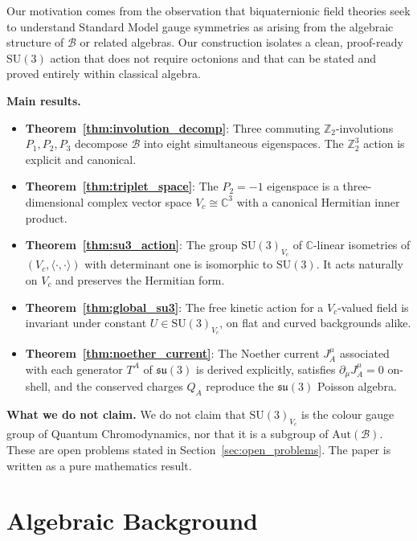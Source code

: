 \documentclass[12pt,a4paper]{article}
\theoremstyle{remark}
\newcommand{\B}{\mathcal{B}}          %
\newcommand{\C}{\mathbb{C}}
\begin{document}
Our motivation comes from the observation that biquaternionic field theories
\cite{Dixon1994,Furey2016} seek to understand Standard Model gauge symmetries
as arising from the algebraic structure of $\B$ or related algebras.  Our
construction isolates a clean, proof-ready $\mathrm{SU}(3)$ action that does
not require octonions and that can be stated and proved entirely within
classical algebra.

\medskip
\noindent\textbf{Main results.}
\begin{itemize}
\item \textbf{Theorem~\ref{thm:involution_decomp}}: Three commuting
  $\mathbb{Z}_2$-involutions $P_1,P_2,P_3$ decompose $\B$ into eight
  simultaneous eigenspaces.  The $\mathbb{Z}_2^3$ action is explicit and
  canonical.
\item \textbf{Theorem~\ref{thm:triplet_space}}: The $P_2=-1$ eigenspace is a
  three-dimensional complex vector space $V_c \cong \C^3$ with a canonical
  Hermitian inner product.
\item \textbf{Theorem~\ref{thm:su3_action}}: The group $\mathrm{SU}(3)_{V_c}$
  of $\C$-linear isometries of $(V_c,\langle\cdot,\cdot\rangle)$ with
  determinant one is isomorphic to $\mathrm{SU}(3)$.  It acts naturally on
  $V_c$ and preserves the Hermitian form.
\item \textbf{Theorem~\ref{thm:global_su3}}: The free kinetic action for a
  $V_c$-valued field is invariant under constant $U\in\mathrm{SU}(3)_{V_c}$,
  on flat and curved backgrounds alike.
\item \textbf{Theorem~\ref{thm:noether_current}}: The Noether current
  $J_A^\mu$ associated with each generator $T^A$ of $\mathfrak{su}(3)$ is
  derived explicitly, satisfies $\partial_\mu J_A^\mu = 0$ on-shell, and
  the conserved charges $Q_A$ reproduce the $\mathfrak{su}(3)$ Poisson algebra.
\end{itemize}

\medskip
\noindent\textbf{What we do not claim.}
We do not claim that $\mathrm{SU}(3)_{V_c}$ is the colour gauge group of
Quantum Chromodynamics, nor that it is a subgroup of $\mathrm{Aut}(\B)$.
These are open problems stated in Section~\ref{sec:open_problems}.  The paper
is written as a pure mathematics result.

\section{Algebraic Background}
\label{sec:background}
\end{document}
